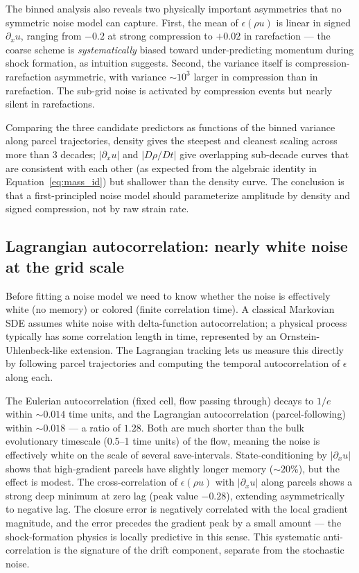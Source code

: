 \documentclass[11pt,letterpaper]{article}
\begin{document}
The binned analysis also reveals two physically important asymmetries that no symmetric noise model can capture. First, the mean of $\epsilon(\rho u)$ is linear in signed $\partial_x u$, ranging from $-0.2$ at strong compression to $+0.02$ in rarefaction --- the coarse scheme is \emph{systematically} biased toward under-predicting momentum during shock formation, as intuition suggests. Second, the variance itself is compression-rarefaction asymmetric, with variance $\sim 10^3$ larger in compression than in rarefaction. The sub-grid noise is activated by compression events but nearly silent in rarefactions.

Comparing the three candidate predictors as functions of the binned variance along parcel trajectories, density gives the steepest and cleanest scaling across more than 3 decades; $|\partial_x u|$ and $|D\rho/Dt|$ give overlapping sub-decade curves that are consistent with each other (as expected from the algebraic identity in Equation~\ref{eq:mass_id}) but shallower than the density curve. The conclusion is that a first-principled noise model should parameterize amplitude by density and signed compression, not by raw strain rate.

\subsection{Lagrangian autocorrelation: nearly white noise at the grid scale}
\label{sec:kmles:autocorr}

Before fitting a noise model we need to know whether the noise is effectively white (no memory) or colored (finite correlation time). A classical Markovian SDE assumes white noise with delta-function autocorrelation; a physical process typically has some correlation length in time, represented by an Ornstein-Uhlenbeck-like extension. The Lagrangian tracking lets us measure this directly by following parcel trajectories and computing the temporal autocorrelation of $\epsilon$ along each.

The Eulerian autocorrelation (fixed cell, flow passing through) decays to $1/e$ within $\sim 0.014$ time units, and the Lagrangian autocorrelation (parcel-following) within $\sim 0.018$ --- a ratio of $1.28$. Both are much shorter than the bulk evolutionary timescale (0.5--1 time units) of the flow, meaning the noise is effectively white on the scale of several save-intervals. State-conditioning by $|\partial_x u|$ shows that high-gradient parcels have slightly longer memory ($\sim 20$\%), but the effect is modest. The cross-correlation of $\epsilon(\rho u)$ with $|\partial_x u|$ along parcels shows a strong deep minimum at zero lag (peak value $-0.28$), extending asymmetrically to negative lag. The closure error is negatively correlated with the local gradient magnitude, and the error precedes the gradient peak by a small amount --- the shock-formation physics is locally predictive in this sense. This systematic anti-correlation is the signature of the drift component, separate from the stochastic noise.
\end{document}

